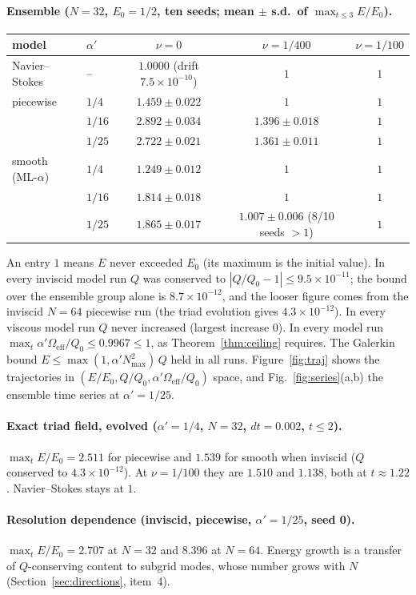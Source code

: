 \documentclass[11pt,a4paper]{article}
\theoremstyle{definition}
\newcommand{\Eff}{\Omega_{\mathrm{eff}}}
\begin{document}
\paragraph{Ensemble ($N=32$, $E_0=1/2$, ten seeds; mean $\pm$ s.d.\ of $\max_{t\le3}E/E_0$).}
\begin{center}\footnotesize
\begin{tabular}{llccc}
\toprule
model & $\alpha'$ & $\nu=0$ & $\nu=1/400$ & $\nu=1/100$ \\
\midrule
Navier--Stokes & -- & $1.0000$ (drift $7.5\times10^{-10}$) & $1$ & $1$ \\
piecewise & $1/4$ & $1.459\pm0.022$ & $1$ & $1$ \\
 & $1/16$ & $2.892\pm0.034$ & $1.396\pm0.018$ & $1$ \\
 & $1/25$ & $2.722\pm0.021$ & $1.361\pm0.011$ & $1$ \\
smooth (ML-$\alpha$) & $1/4$ & $1.249\pm0.012$ & $1$ & $1$ \\
 & $1/16$ & $1.814\pm0.018$ & $1$ & $1$ \\
 & $1/25$ & $1.865\pm0.017$ & $1.007\pm0.006$ (8/10 seeds $>1$) & $1$ \\
\bottomrule
\end{tabular}
\end{center}
An entry $1$ means $E$ never exceeded $E_0$ (its maximum is the initial value). In every inviscid model run $Q$ was conserved to $|Q/Q_0-1|\le9.5\times10^{-11}$; the bound over the ensemble group alone is $8.7\times10^{-12}$, and the looser figure comes from the inviscid $N=64$ piecewise run (the triad evolution gives $4.3\times10^{-12}$). In every viscous model run $Q$ never increased (largest increase $0$). In every model run $\max_t\alpha'\Eff/Q_0\le0.9967\le1$, as Theorem~\ref{thm:ceiling} requires. The Galerkin bound $E\le\max(1,\alpha'N_{\max}^2)\,Q$ held in all runs. Figure~\ref{fig:traj} shows the trajectories in $(E/E_0,Q/Q_0,\alpha'\Eff/Q_0)$ space, and Fig.~\ref{fig:series}(a,b) the ensemble time series at $\alpha'=1/25$.

\paragraph{Exact triad field, evolved ($\alpha'=1/4$, $N=32$, $dt=0.002$, $t\le2$).} $\max_tE/E_0=2.511$ for piecewise and $1.539$ for smooth when inviscid ($Q$ conserved to $4.3\times10^{-12}$). At $\nu=1/100$ they are $1.510$ and $1.138$, both at $t\approx1.22$. Navier--Stokes stays at $1$.

\paragraph{Resolution dependence (inviscid, piecewise, $\alpha'=1/25$, seed 0).} $\max_tE/E_0=2.707$ at $N=32$ and $8.396$ at $N=64$. Energy growth is a transfer of $Q$-conserving content to subgrid modes, whose number grows with $N$ (Section~\ref{sec:directions}, item~4).
\end{document}
